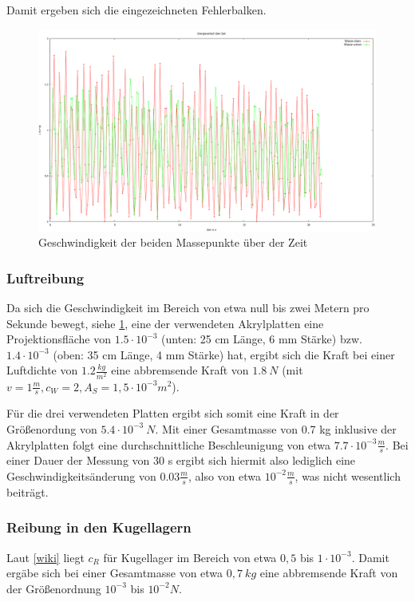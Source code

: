 Damit ergeben sich die eingezeichneten Fehlerbalken. 


\begin{figure}
        \includegraphics[width=.9\textwidth]{images/v_ueber_t.png}
\caption{Geschwindigkeit der beiden Massepunkte über der Zeit}
\label{v_ueber_t}
\end{figure}


\subsubsection{Luftreibung}
Da sich die Geschwindigkeit im Bereich von etwa null bis zwei Metern pro Sekunde bewegt, siehe \ref{v_ueber_t}, eine der verwendeten Akrylplatten eine Projektionsfläche von $ 1.5 \cdot 10^{-3} $ (unten: 25 cm Länge, 6 mm Stärke) bzw. $ 1.4 \cdot 10^{-3} $ (oben: 35 cm Länge, 4 mm Stärke) hat, ergibt sich die Kraft bei einer Luftdichte von $ 1.2 \frac{kg}{m^2} $ eine abbremsende Kraft von $ 1.8 \ N $ (mit $ v = 1 \frac{m}{s}, c_W = 2, A_S = 1,5 \cdot 10^{-3} m^2 $). 

Für die drei verwendeten Platten ergibt sich somit eine Kraft in der Größenordung von $ 5.4 \cdot 10^{-3} \ N $. Mit einer Gesamtmasse von 0.7 kg inklusive der Akrylplatten folgt eine durchschnittliche Beschleunigung von etwa $ 7.7 \cdot 10^{-3} \frac{m}{s} $. Bei einer Dauer der Messung von 30 s ergibt sich hiermit also lediglich eine Geschwindigkeitsänderung von $ 0.03 \frac{m}{s} $, also von etwa $ 10^{-2} \frac{m}{s} $, was nicht wesentlich beiträgt. 


\subsubsection{Reibung in den Kugellagern}
Laut \ref{wiki} liegt $ c_R $ für Kugellager im Bereich von etwa 
$ 0,5 $ bis $ 1 \cdot 10^{-3} $. 
Damit ergäbe sich bei einer Gesamtmasse von etwa $ 0,7 \  kg  $ eine abbremsende Kraft von der Größenordnung $ 10^{-3} $ bis $ 10^{-2} N $. 

